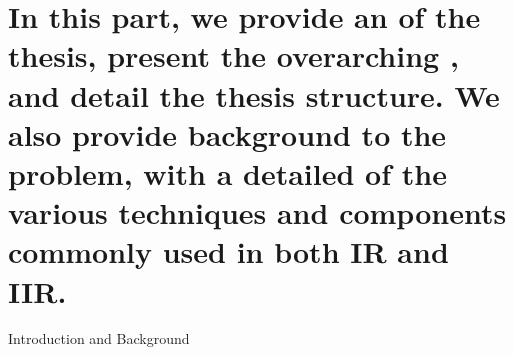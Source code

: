 
\part[Introduction and Background]{In this part, we provide an  of the thesis, present the overarching , and detail the thesis structure. We also provide background to the problem, with a detailed  of the various techniques and components commonly used in both IR and IIR.}{Introduction and Background}
\label{part:intro}